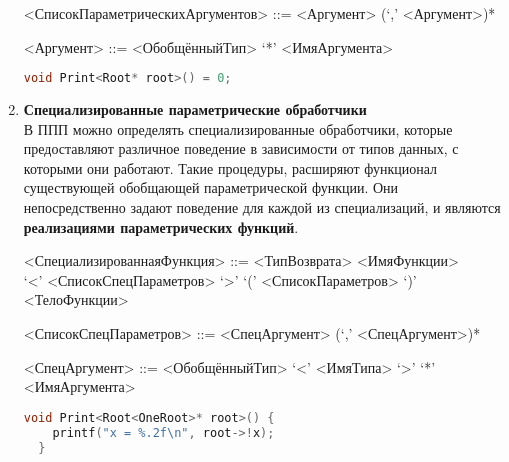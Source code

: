 \begin{enumerate}
\begin{centerframebox}
\begin{grammar}
      <СписокПараметрическихАргументов> ::= <Аргумент> (`,' <Аргумент>)*

      <Аргумент> ::= <ОбобщённыйТип> `*' <ИмяАргумента>
    \end{grammar}
  \end{centerframebox}

\begin{lstlisting}[language=c, caption={Пример параметрической функции}, label={lst:fancyheader}]
  void Print<Root* root>() = 0;
\end{lstlisting}

  \item \textbf{Специализированные параметрические обработчики} \\
    В ППП можно определять специализированные обработчики, которые предоставляют различное поведение в зависимости от типов данных, с которыми они работают.
    Такие процедуры, расширяют функционал существующей обобщающей параметрической функции.
    Они непосредственно задают поведение для каждой из специализаций, и являются \textbf{реализациями параметрических функций}.

  \begin{centerframebox}
    \small
    \begin{grammar}
      <СпециализированнаяФункция> ::= <ТипВозврата> <ИмяФункции> \\
      `<' <СписокСпецПараметров> `>' `(' <СписокПараметров> `)'
      <ТелоФункции>

      <СписокСпецПараметров> ::= <СпецАргумент> (`,' <СпецАргумент>)*

      <СпецАргумент> ::= <ОбобщённыйТип> `<' <ИмяТипа> `>' `*' <ИмяАргумента>
    \end{grammar}
  \end{centerframebox}

\begin{lstlisting}[language=c, caption={Пример специализированного обработчика}, label={lst:fancymethod}]
  void Print<Root<OneRoot>* root>() {
    printf("x = %.2f\n", root->!x);
  }
\end{lstlisting}
\end{enumerate}

